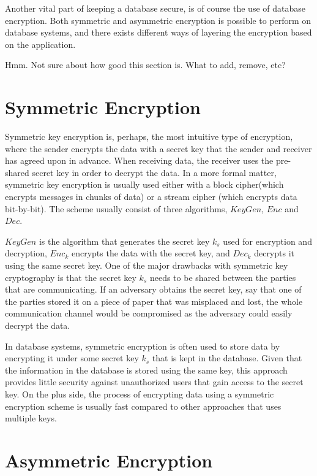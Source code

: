 Another vital part of keeping a database secure, is of course the use of database encryption. Both symmetric and asymmetric encryption is possible to perform on database systems, and there exists different ways of layering the encryption based on the application.


Hmm. Not sure about how good this section is. What to add, remove, etc?

\section{Symmetric Encryption}

Symmetric key encryption is, perhaps, the most intuitive type of encryption, where the sender encrypts the data with a secret key that the sender and receiver has agreed upon in advance. When receiving data, the receiver uses the pre-shared secret key in order to decrypt the data. In a more formal matter, symmetric key encryption is usually used either with a block cipher(which encrypts messages in chunks of data) or a stream cipher (which encrypts data bit-by-bit). The scheme usually consist of three algorithms, $KeyGen$, $Enc$ and $Dec$.

$KeyGen$ is the algorithm that generates the secret key $k_s$ used for encryption and decryption, $Enc_k$ encrypts the data with the secret key, and $Dec_k$ decrypts it using the same secret key. One of the major drawbacks with symmetric key cryptography is that the secret key $k_s$ needs to be shared between the parties that are communicating. If an adversary obtains the secret key, say that one of the parties stored it on a piece of paper that was misplaced and lost, the whole communication channel would be compromised as the adversary could easily decrypt the data.

In database systems, symmetric encryption is often used to store data by encrypting it under some secret key $k_s$ that is kept in the database. Given that the information in the database is stored using the same key, this approach provides little security against unauthorized users that gain access to the secret key. On the plus side, the process of encrypting data using a symmetric encryption scheme is usually fast compared to other approaches that uses multiple keys.


\section{Asymmetric Encryption}

